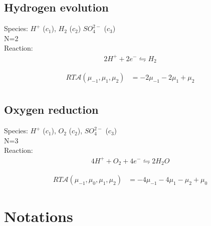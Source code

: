 \documentclass[12pt,oneside,reqno]{amsart}
\numberwithin{equation}{section}
\begin{document}
\subsection{Hydrogen evolution}
Species: $H^+$ ($c_1$), $H_2$ ($c_2$) $SO_4^{2-}$ ($c_3$)\\
N=2\\
Reaction:
\begin{align}
  2H^+ + 2e^- \leftrightharpoons  H_2
\end{align}

\begin{align}
  RT\mathcal A(\mu_{-1}, \mu_1,\mu_2)&=-2\mu_{-1}-2\mu_1+\mu_2\\
\end{align}



\subsection{Oxygen reduction}
Species: $H^+$ ($c_1$),  $O_2$ ($c_2$), $SO_4^{2-}$ ($c_3$)\\
N=3\\
Reaction:
\begin{align}
  4H^+ + O_2 + 4e^- \leftrightharpoons  2H_2O
\end{align}

\begin{align}
  RT \mathcal A(\mu_{-1}, \mu_0,\mu_1,\mu_2)&=-4\mu_{-1}-4\mu_1-\mu_2+\mu_0
\end{align}



\clearpage




\appendix
\section{Notations}
\end{document}
